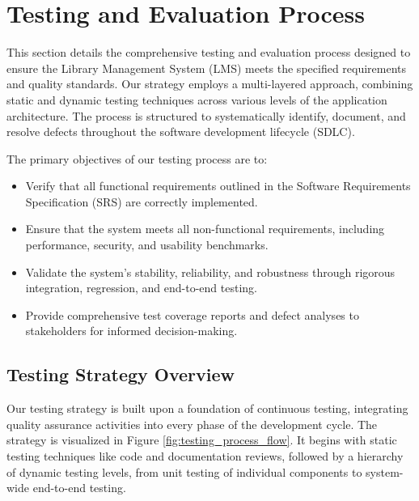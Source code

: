 \chapter{Testing and Evaluation Process}
\label{chap:testing_process}

This section details the comprehensive testing and evaluation process designed to ensure the Library Management System (LMS) meets the specified requirements and quality standards. Our strategy employs a multi-layered approach, combining static and dynamic testing techniques across various levels of the application architecture. The process is structured to systematically identify, document, and resolve defects throughout the software development lifecycle (SDLC).

The primary objectives of our testing process are to:
\begin{itemize}
    \item Verify that all functional requirements outlined in the Software Requirements Specification (SRS) are correctly implemented.
    \item Ensure that the system meets all non-functional requirements, including performance, security, and usability benchmarks.
    \item Validate the system's stability, reliability, and robustness through rigorous integration, regression, and end-to-end testing.
    \item Provide comprehensive test coverage reports and defect analyses to stakeholders for informed decision-making.
\end{itemize}

\section{Testing Strategy Overview}
Our testing strategy is built upon a foundation of continuous testing, integrating quality assurance activities into every phase of the development cycle. The strategy is visualized in Figure \ref{fig:testing_process_flow}. It begins with static testing techniques like code and documentation reviews, followed by a hierarchy of dynamic testing levels, from unit testing of individual components to system-wide end-to-end testing.

